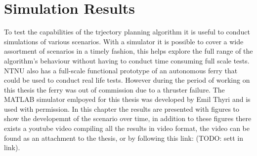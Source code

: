 \section{Simulation Results}

To test the capabilities of the trjectory planning algorithm it is useful to conduct simulations of various scenarios.
With a simulator it is possible to cover a wide assortment of scenarios in a timely fashion, this helps explore the full
range of the algorithm's behaviour without having to conduct time consuming full scale tests. NTNU also has a full-scale
functional prototype of an autonomous ferry that could be used to conduct real life tests. However during the period of working
on this thesis the ferry was out of commission due to a thruster failure.
The MATLAB simulator emlpoyed for this thesis was developed by Emil Thyri and is used with permission. In this chapter the results
are presented with figures to show the developemnt of the scenario over time, in addition to these figures there exists a youtube video compiling
all the results in video format, the video can be found as an attachment to the thesis, or by following this link: (TODO: sett in link).

